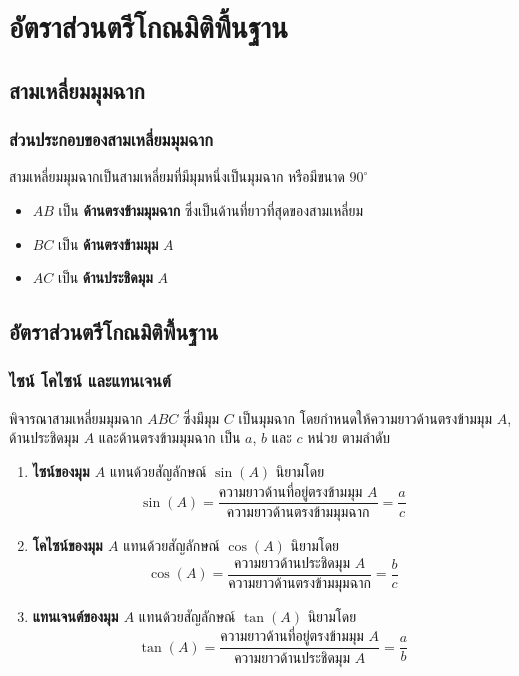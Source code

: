 \chapter{อัตราส่วนตรีโกณมิติพื้นฐาน}

\section{สามเหลี่ยมมุมฉาก}

\subsection{ส่วนประกอบของสามเหลี่ยมมุมฉาก}

สามเหลี่ยมมุมฉากเป็นสามเหลี่ยมที่มีมุมหนึ่งเป็นมุมฉาก หรือมีขนาด \(90^\circ\)

\begin{itemize}
	\item \(AB\) เป็น \textbf{ด้านตรงข้ามมุมฉาก} ซึ่งเป็นด้านที่ยาวที่สุดของสามเหลี่ยม
	\item \(BC\) เป็น \textbf{ด้านตรงข้ามมุม} \(A\)
	\item \(AC\) เป็น \textbf{ด้านประชิดมุม} \(A\)
\end{itemize}

\section{อัตราส่วนตรีโกณมิติพื้นฐาน}

\subsection{ไซน์ โคไซน์ และแทนเจนต์}

พิจารณาสามเหลี่ยมมุมฉาก \(ABC\) ซึ่งมีมุม \(C\) เป็นมุมฉาก 
โดยกำหนดให้ความยาวด้านตรงข้ามมุม \(A\),
ด้านประชิดมุม \(A\) และด้านตรงข้ามมุมฉาก
เป็น \(a\), \(b\) และ \(c\) หน่วย ตามลำดับ 


\begin{remarkbox}
	\begin{enumerate}
		\item \textbf{ไซน์ของมุม $A$} แทนด้วยสัญลักษณ์ $\sin(A)$ นิยามโดย
		\[
		\sin(A)=\frac{\text{ความยาวด้านที่อยู่ตรงข้ามมุม } A}{\text{ความยาวด้านตรงข้ามมุมฉาก}}
		=\frac{a}{c}
		\]
		
		\item \textbf{โคไซน์ของมุม $A$} แทนด้วยสัญลักษณ์ $\cos(A)$ นิยามโดย
		\[
		\cos(A)=\frac{\text{ความยาวด้านประชิดมุม } A}{\text{ความยาวด้านตรงข้ามมุมฉาก}}
		=\frac{b}{c}
		\]
		
		\item \textbf{แทนเจนต์ของมุม $A$} แทนด้วยสัญลักษณ์ $\tan(A)$ นิยามโดย
		\[
		\tan(A)=\frac{\text{ความยาวด้านที่อยู่ตรงข้ามมุม } A}{\text{ความยาวด้านประชิดมุม } A}
		=\frac{a}{b}
		\]
	\end{enumerate}
\end{remarkbox}


